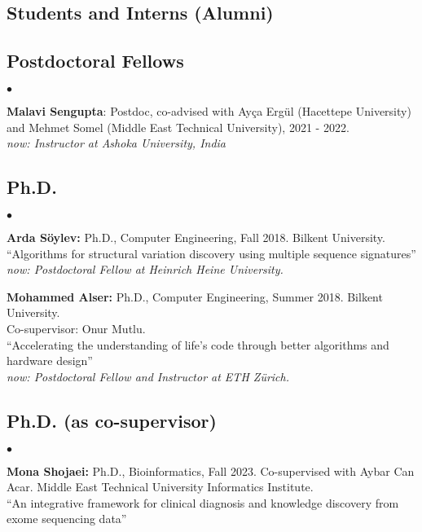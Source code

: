 \documentclass[margin,line]{res}
\newenvironment{list2}{
  \begin{list}{$\bullet$}{%
      \setlength{\itemsep}{0.1cm}
      \setlength{\parsep}{0in} \setlength{\parskip}{0in}
      \setlength{\topsep}{0in} \setlength{\partopsep}{0in} 
      \setlength{\leftmargin}{0.2in}}}{\end{list}}
\begin{document}
\begin{resume}
\section{\sc Students and Interns (Alumni)}
\vspace*{-.4cm}

\subsection{\small \sc Postdoctoral Fellows}
\begin{list2}
\item 
{\bf Malavi Sengupta}: Postdoc, co-advised with Ayça Ergül (Hacettepe University) and Mehmet Somel (Middle East Technical University), 2021 - 2022.\\
\textit{now: Instructor at Ashoka University,  India}
\end{list2}

\vspace*{-.4cm}

\subsection{\small \sc Ph.D.}
\begin{list2}
\item
  {\bf Arda Söylev:} Ph.D., Computer Engineering, Fall 2018.
  Bilkent University. \\
  ``Algorithms for structural variation discovery using multiple sequence signatures''\\
    {\it now: Postdoctoral Fellow at Heinrich Heine University.}
\item
  {\bf Mohammed Alser:} Ph.D., Computer Engineering, Summer 2018.
  Bilkent University.\\ Co-supervisor: Onur Mutlu.\\
  ``Accelerating the understanding of life’s code through better algorithms and hardware design''\\
  {\it now: Postdoctoral Fellow and Instructor at ETH Zürich.}
\end{list2}

\vspace*{-.4cm}
\subsection{\small \sc Ph.D. (as co-supervisor)}
\begin{list2}
\item
{\bf Mona Shojaei:} Ph.D., Bioinformatics,  Fall 2023.
Co-supervised with Aybar Can Acar.
  Middle East Technical University Informatics Institute.\\
  ``An integrative framework for clinical diagnosis and knowledge discovery from exome sequencing data''


\end{list2}
\end{resume}
\end{document}
